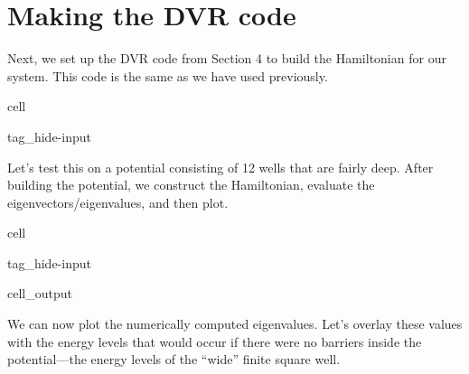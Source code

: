 \documentclass[letterpaper,10pt,english]{jupyterBook}
\begin{document}
\section{Making the DVR code}
\label{\detokenize{Section6_v2:making-the-dvr-code}}
\sphinxAtStartPar
Next, we set up the DVR code from Section 4 to build the Hamiltonian for our system. This code is the same as we have used previously.

\begin{sphinxuseclass}{cell}
\begin{sphinxuseclass}{tag_hide-input}
\end{sphinxuseclass}
\end{sphinxuseclass}
\sphinxAtStartPar
Let’s test this on a potential consisting of 12 wells that are fairly deep. After building the potential, we construct the Hamiltonian, evaluate the eigenvectors/eigenvalues, and then plot.

\begin{sphinxuseclass}{cell}
\begin{sphinxuseclass}{tag_hide-input}\begin{sphinxVerbatimOutput}

\begin{sphinxuseclass}{cell_output}
\noindent{}

\end{sphinxuseclass}\end{sphinxVerbatimOutput}

\end{sphinxuseclass}
\end{sphinxuseclass}
\sphinxAtStartPar
We can now plot the numerically computed eigenvalues. Let’s overlay these values with the energy levels that would occur if there were no barriers inside the potential—the energy levels of the “wide” finite square well.
\end{document}
